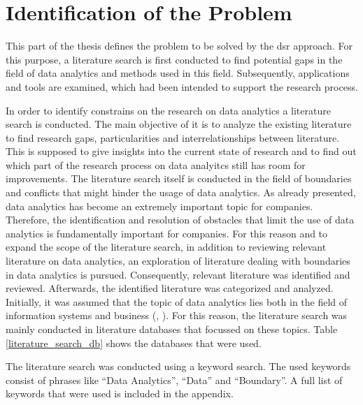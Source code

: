 \newpage\section{Identification of the Problem}\label{sec:identification_of_the_problem}

This part of the thesis defines the problem to be solved by the \ac{dsr} approach. For this purpose, a literature search is first conducted to find potential gaps in the field of data analytics and methods used in this field. Subsequently, applications and tools are examined, which had been intended to support the research process.

In order to identify constrains on the research on data analytics a literature search is conducted. The main objective of it is to analyze the existing literature to find research gaps, particularities and interrelationships between literature. This is supposed to give insights into the current state of research and to find out which part of the research process on data analyitcs still has room for improvements. The literature search itself is conducted in the field of boundaries and conflicts that might hinder the usage of data analytics. As already presented, data analytics has become an extremely important topic for companies. Therefore, the identification and resolution of obstacles that limit the use of data analytics is fundamentally important for companies. For this reason and to expand the scope of the literature search, in addition to reviewing relevant literature on data analytics, an exploration of literature dealing with boundaries in data analytics is pursued. Consequently, relevant literature was identified and reviewed. Afterwards, the identified literature was categorized and analyzed. Initially, it was assumed that the topic of data analytics lies both in the field of information systems and business (\cite{Abbasi.2016}, \cite{Levina.2005}). For this reason, the literature search was mainly conducted in literature databases that focussed on these topics. Table \ref{literature_search_db} shows the databases that were used. 

The literature search was conducted using a keyword search. The used keywords consist of phrases like \enquote{Data Analytics}, \enquote{Data} and \enquote{Boundary}. A full list of keywords that were used is included in the appendix. %


